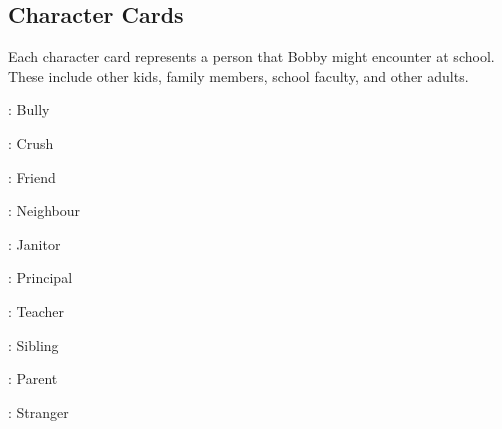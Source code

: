 \subsection{Character Cards}
Each character card represents a person that Bobby might encounter at school. These include other kids, family members, school faculty, and other adults.
\vspace{-1.75ex}
\begin{multicols}{2}
\begin{cardlist}[itemsep=0pt, topsep=0pt, partopsep=0pt]
  \item[\redjack\diamonds:] Bully
  \item[\redqueen\diamonds:] Crush
  \item[\redking\diamonds:] Friend
  \item[\queen\clubs:] Neighbour
  \item[\king\clubs:] Janitor
  \item[\jack\spades:] Principal
  \item[\queen\spades:] Teacher
  \item[\redjack\hearts:] Sibling
  \item[\redking\hearts:] Parent
  \item[\hspace{0.19cm}\joker:] Stranger
\end{cardlist}
\end{multicols}
